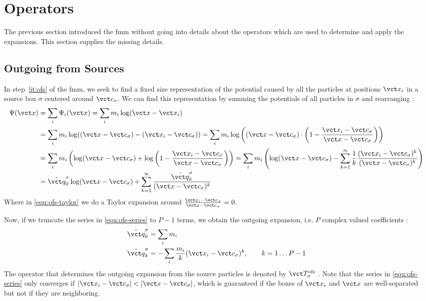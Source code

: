 \section{Operators}
\label{operators}

The previous section introduced the \gls{fmm} without going into details about the operators which are used to determine and apply the expansions.
This section supplies the missing details.

\subsection{Outgoing from Sources}

In step~\ref{it:ofs} of the \gls{fmm}, we seek to find a fixed size representation of the potential caused by all the particles at positions $\vct x_i$ in a source box $\sigma$ centered around $\vct c_\sigma$.
We can find this representation by summing the potentials of all particles in $\sigma$ and rearranging \cite{SicchaSeminar, Martinsson2015}:
\begin{align}
  \Psi(\vct x) &= \sum_i \Psi_i(\vct x)
   = \sum_i m_i \log(\vct x - \vct x_i) \\
  &= \sum_i m_i \log((\vct x - \vct c_\sigma) - (\vct x_i - \vct c_\sigma))
   = \sum_i m_i \log\left(
                  \left(\vct x - \vct c_\sigma \right)\cdot
                  \left(1 - \frac{\vct x_i - \vct c_\sigma}{\vct x - \vct c_\sigma} \right)
              \right) \\
  &= \sum_i m_i \left( \log(\vct x - \vct c_\sigma) + \log \left(1 - \frac{\vct x_i - \vct c_\sigma}{\vct x - \vct c_\sigma} \right) \right)
   = \sum_i m_i \left( \log(\vct x - \vct c_\sigma) - \sum_{k=1}^\infty \frac 1k \frac{(\vct x_i - \vct c_\sigma)^k}{(\vct x - \vct c_\sigma)^k} \right) \label{equ:ofs-taylor} \\
  &= \hat{\vct q}_0^\sigma \log(\vct x - \vct c_\sigma) + \sum_{k=1}^\infty \frac{\hat{\vct q}_k^\sigma}{(\vct x - \vct c_\sigma)^k} \label{equ:ofs-series}
\end{align}
Where in \cref{equ:ofs-taylor} we do a Taylor expansion around $\frac{\vct x_i - \vct c_\sigma}{\vct x - \vct c_\sigma} = 0$.

Now, if we truncate the series in \cref{equ:ofs-series} to $P-1$ terms, we obtain the outgoing expansion, i.e. $P$ complex valued coefficients \cite{Martinsson2015}:
\begin{equation}
  \begin{split}
    \hat{\vct q}_0^\sigma &=   \sum_i m_i \\
    \hat{\vct q}_k^\sigma &= - \sum_i \frac{m_i}{k} (\vct x_i - \vct c_\sigma)^k, \qquad k = 1 \dots P-1
  \end{split}
\end{equation}
The operator that determines the outgoing expansion from the source particles is denoted by $\vct T_\sigma^\mathrm{ofs}$ \cite{Martinsson2015}.
Note that the series in \cref{equ:ofs-series} only converges if $|\vct x_i - \vct c_\sigma| < |\vct x - \vct c_\sigma|$, which is guaranteed if the boxes of $\vct x_i$ and $\vct x$ are well-separated but not if they are neighboring.

